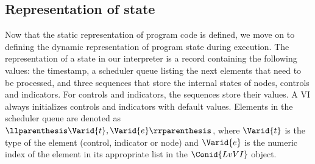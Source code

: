 \subsection{Representation of state}

Now that the static representation of program code is defined, we move on
to defining the dynamic representation of program state during execution.
The representation of a state in our interpreter is a record containing the
following values: the timestamp, a scheduler queue listing the next elements
that need to be processed, and three sequences that store the internal states
of nodes, controls and indicators. For controls and indicators, the sequences
store their values. A VI always initializes controls and indicators with
default values. Elements in the scheduler queue are denoted as \ensuremath{\llparenthesis \Varid{t}, \Varid{e}\rrparenthesis }, where \ensuremath{\Varid{t}} is the type of the element (control, indicator or node) and \ensuremath{\Varid{e}}
is the numeric index of the element in its appropriate list in the \ensuremath{\Conid{LvVI}}
object.

